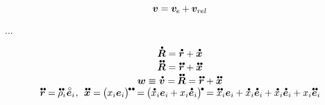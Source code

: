 \begin{otherlanguage}{russian}
\begin{equation}
\bm{v} = \bm{v}_{\hspace{-0.1ex}e} \hspace{-0.1ex} + \bm{v}_{r\kern-0.1exel}
\end{equation}

...

\begin{equation*}
\begin{array}{c}
\mathdotabove{\bm{R}} = \mathdotabove{\bm{r}} + \mathdotabove{\bm{x}}
\\
\mathdotdotabove{\bm{R}} = \mathdotdotabove{\bm{r}} + \mathdotdotabove{\bm{x}}
\\
\bm{w} \equiv \hspace{.1ex} \mathdotabove{\bm{v}} = \hspace{-0.15ex} \mathdotdotabove{\bm{R}} = \mathdotdotabove{\bm{r}} + \mathdotdotabove{\bm{x}}
\\
\mathdotdotabove{\bm{r}} = \hspace{-0.1ex}
\mathdotdotabove{\rho}_i \hspace{.1ex} \mathcircabove{\bm{e}}_i
\hspace{.1ex} , \:\:
\mathdotdotabove{\bm{x}} = \hspace{-0.15ex} \bigl( x_i \bm{e}_i \bigr)^{ \hspace{-0.15ex} \tikz[baseline=-0.2ex] \draw[black, fill=black] (0,0) circle (.28ex); \hspace{.2ex} \tikz[baseline=-0.2ex] \draw[black, fill=black] (0,0) circle (.28ex); } \hspace{-0.2ex}
= \hspace{-0.15ex} \bigl( \mathdotabove{x}_i \bm{e}_i \hspace{-0.1ex} + x_i \mathdotabove{\bm{e}}_i \bigr)^{ \hspace{-0.15ex} \tikz[baseline=-0.2ex] \draw[black, fill=black] (0,0) circle (.28ex); } \hspace{-0.15ex}
= \mathdotdotabove{x}_i \bm{e}_i \hspace{-0.1ex} + \mathdotabove{x}_i \mathdotabove{\bm{e}}_i \hspace{-0.1ex}
+ \mathdotabove{x}_i \mathdotabove{\bm{e}}_i \hspace{-0.1ex} + x_i \mathdotdotabove{\bm{e}}_i \hspace{-0.1ex}
\end{array}
\end{equation*}


\end{otherlanguage}
